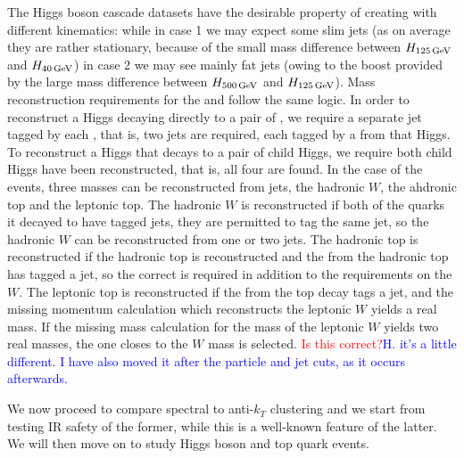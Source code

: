     The Higgs boson cascade datasets have the desirable property of creating  with different kinematics: while in case 1 we may expect some slim  jets (as on average they are rather stationary, because of the small mass difference between $H_{125\,{\rm GeV}}$ and $H_{40\,{\rm GeV}}$)
in case 2 we may see mainly fat jets (owing to the boost provided by the large mass difference between $H_{500\,{\rm GeV}}$ and $H_{125\,{\rm GeV}}$).
Mass reconstruction requirements for the  and  follow the same logic.
In order to reconstruct a Higgs decaying directly to a pair of , we require a separate jet tagged by each , that is, two jets are required, each tagged by a  from that Higgs.
To reconstruct a Higgs that decays to a pair of child Higgs, we require both child Higgs have been reconstructed, that is, all four  are found.
In the case of the  events, three masses can be reconstructed from jets, the hadronic \(W\), the ahdronic top and the leptonic top.
The hadronic \(W\) is reconstructed if both of the quarks it decayed to have tagged jets, they are permitted to tag the same jet, so the hadronic \(W\) can be reconstructed from one or two jets.
The hadronic top is reconstructed if the hadronic top is reconstructed and the  from the hadronic top has tagged a jet, so the correct  is required in addition to the requirements on the \(W\).
The leptonic top is reconstructed if the  from the top decay tags a jet, and the missing momentum calculation which reconstructs the leptonic \(W\) yields a real mass.
If the missing mass calculation for the mass of the leptonic \(W\) yields two real masses, the one closes to the \(W\) mass is selected.
{\textcolor{red}{Is this correct?}\textcolor{blue}{H. it's a little different. I have also moved it after the particle and jet cuts, as it occurs afterwards.}}

We now proceed to compare spectral to anti-$k_T$ clustering and we start from testing IR safety of the former, while this is a well-known feature of the latter. We will then move on to study Higgs boson and top quark events.

